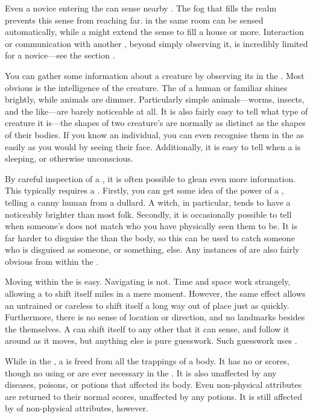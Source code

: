 Even a novice entering the {\mentalrealm} can sense nearby {\minds}.
The fog that fills the realm prevents this sense from reaching far.
\capital{\minds} in the same room can be sensed automatically, while a  might extend the sense to fill a house or more.
Interaction or communication with another {\mind}, beyond simply observing it, is incredibly limited for a novice---see the section .

You can gather some information about a creature by observing its {\mind} in the {\mentalrealm}.
Most obvious is the intelligence of the creature.
The {\mind} of a human or familiar shines brightly, while animals are dimmer.
Particularly simple animals---worms, insects, and the like---are barely noticeable at all.
It is also fairly easy to tell what type of creature it is---the shapes of two creature's {\minds} are normally as distinct as the shapes of their bodies.
If you know an individual, you can even recognise them in the {\mentalrealm} as easily as you would by seeing their face.
Additionally, it is easy to tell when a {\mind} is sleeping, or otherwise unconscious.

By careful inspection of a {\mind}, it is often possible to glean even more information.
This typically requires a  {\test}.
Firstly, you can get some idea of the power of a {\mind}, telling a canny human from a dullard.
A witch, in particular, tends to have a noticeably brighter {\mind} than most folk.
Secondly, it is occasionally possible to tell when someone's {\mind} does not match who you have physically seen them to be.
It is far harder to disguise the {\mind} than the body, so this can be used to catch someone who is disguised as someone, or something, else.
Any instances of {\possession} are also fairly obvious from within the {\mentalrealm}.

Moving within the {\mentalrealm} is easy.
Navigating is not.
Time and space work strangely, allowing a {\mind} to shift itself miles in a mere moment.
However, the same effect allows an untrained or careless {\mind} to shift itself a long way out of place just as quickly.
Furthermore, there is no sense of location or direction, and no landmarks besides the {\minds} themselves.
A {\mind} can shift itself to any other {\mind} that it can sense, and follow it around as it moves, but anything else is pure guesswork.
Such guesswork uses  {\tests}.

While in the {\mentalrealm}, a {\mind} is freed from all the trappings of a body.
It has no  or  scores, though no {\tests} using  or  are ever necessary in the {\mentalrealm}.
It is also unaffected by any diseases, poisons, or potions that affected its body.
Even non-physical attributes are returned to their normal scores, unaffected by any potions.
It is still affected by {\exhaustion} of non-physical attributes, however.


